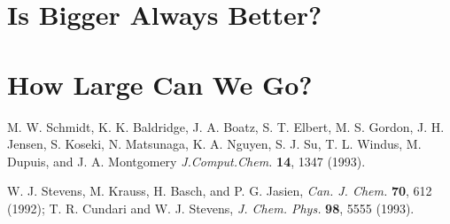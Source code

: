 \documentclass[oneside,12pt]{book}
\begin{document}
\section{Is Bigger Always Better?}
\section{How Large Can We Go?}

\begin{thebibliography}{99}
 M. W. Schmidt, K. K. Baldridge, J. A. Boatz,
S. T. Elbert, M. S. Gordon, J. H. Jensen, S. Koseki, N. Matsunaga,
K. A. Nguyen, S. J. Su, T. L. Windus, M. Dupuis, and J. A. Montgomery
\textit{J.Comput.Chem.}  \textbf{14}, 1347 (1993).

 W. J. Stevens, M. Krauss, H. Basch, and P. G. Jasien,
\textit{Can. J.  Chem.} \textbf{70}, 612 (1992); T. R. Cundari and
W. J. Stevens, \textit{J. Chem.  Phys.} \textbf{98}, 5555
(1993).
\end{thebibliography}
\end{document}
